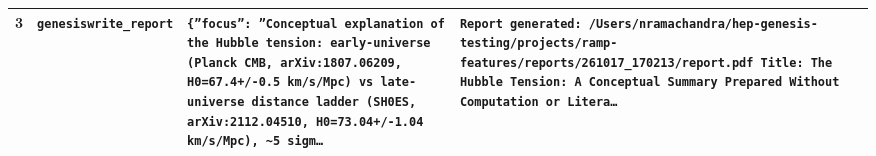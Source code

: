 \documentclass[11pt,a4paper]{article}
\begin{document}
\begin{longtable}{@{}p{}p{}p{}p{}@{}}
3 & \texttt{genesis}\newline\texttt{write\_\allowbreak{}report} & \texttt{\{''focus'':\allowbreak{} ''Conceptual explanation of the Hubble tension:\allowbreak{} early-universe (Planck CMB,\allowbreak{} arXiv:\allowbreak{}1807.06209,\allowbreak{} H0=\allowbreak{}67.4+/\allowbreak{}-0.5 km/\allowbreak{}s/\allowbreak{}Mpc)\allowbreak{} vs late-universe distance ladder (SH0ES,\allowbreak{} arXiv:\allowbreak{}2112.04510,\allowbreak{} H0=\allowbreak{}73.04+/\allowbreak{}-1.04 km/\allowbreak{}s/\allowbreak{}Mpc)\allowbreak{},\allowbreak{} \textasciitilde{}\allowbreak{}5 sigm\ldots{}\allowbreak{}} & \texttt{Report generated:\allowbreak{} /\allowbreak{}Users/\allowbreak{}nramachandra/\allowbreak{}hep-genesis-testing/\allowbreak{}projects/\allowbreak{}ramp-features/\allowbreak{}reports/\allowbreak{}261017\_\allowbreak{}170213/\allowbreak{}report.pdf Title:\allowbreak{} The Hubble Tension:\allowbreak{} A Conceptual Summary Prepared Without Computation or Litera\ldots{}\allowbreak{}} \\
\bottomrule\end{longtable}
\end{document}
